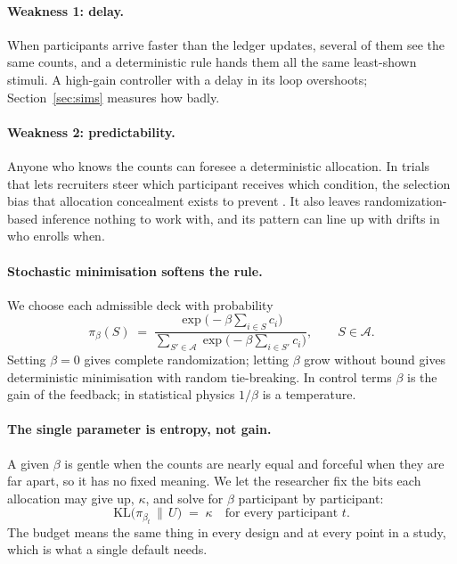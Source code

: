 \documentclass[11pt]{article}
\newcommand{\A}{\mathcal{A}}
\newcommand{\KL}{\mathrm{KL}}
\newcommand{\Unif}{U}
\begin{document}
\paragraph{Weakness 1: delay.} When participants arrive faster than the ledger updates, several of them see the same counts, and a deterministic rule hands them all the same least-shown stimuli. A high-gain controller with a delay in its loop overshoots; Section~\ref{sec:sims} measures how badly.

\paragraph{Weakness 2: predictability.} Anyone who knows the counts can foresee a deterministic allocation. In trials that lets recruiters steer which participant receives which condition, the selection bias that allocation concealment exists to prevent \citep{blackwell1957,schulz2002}. It also leaves randomization-based inference nothing to work with, and its pattern can line up with drifts in who enrolls when.

\paragraph{Stochastic minimisation softens the rule.} We choose each admissible deck with probability
\begin{equation}\label{eq:gibbs}
\pi_\beta(S) \;=\; \frac{\exp\big(-\beta\sum_{i\in S} c_i\big)}{\sum_{S'\in\A}\exp\big(-\beta\sum_{i\in S'} c_i\big)}, \qquad S\in\A.
\end{equation}
Setting $\beta=0$ gives complete randomization; letting $\beta$ grow without bound gives deterministic minimisation with random tie-breaking. In control terms $\beta$ is the gain of the feedback; in statistical physics $1/\beta$ is a temperature.

\paragraph{The single parameter is entropy, not gain.} A given $\beta$ is gentle when the counts are nearly equal and forceful when they are far apart, so it has no fixed meaning. We let the researcher fix the bits each allocation may give up, $\kappa$, and solve for $\beta$ participant by participant:
\begin{equation}\label{eq:budget}
\KL\big(\pi_{\beta_t}\,\big\|\,\Unif\big) \;=\; \kappa \quad\text{for every participant } t.
\end{equation}
The budget means the same thing in every design and at every point in a study, which is what a single default needs.
\end{document}

